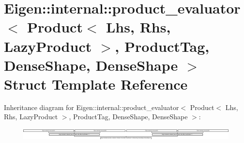 \hypertarget{struct_eigen_1_1internal_1_1product__evaluator_3_01_product_3_01_lhs_00_01_rhs_00_01_lazy_produc1ed1c0c8715953d10d735722e273406b}{}\section{Eigen\+:\+:internal\+:\+:product\+\_\+evaluator$<$ Product$<$ Lhs, Rhs, Lazy\+Product $>$, Product\+Tag, Dense\+Shape, Dense\+Shape $>$ Struct Template Reference}
\label{struct_eigen_1_1internal_1_1product__evaluator_3_01_product_3_01_lhs_00_01_rhs_00_01_lazy_produc1ed1c0c8715953d10d735722e273406b}
Inheritance diagram for Eigen\+:\+:internal\+:\+:product\+\_\+evaluator$<$ Product$<$ Lhs, Rhs, Lazy\+Product $>$, Product\+Tag, Dense\+Shape, Dense\+Shape $>$\+:\begin{figure}[H]
\begin{center}
\leavevmode
\includegraphics[height=0.629685cm]{struct_eigen_1_1internal_1_1product__evaluator_3_01_product_3_01_lhs_00_01_rhs_00_01_lazy_produc1ed1c0c8715953d10d735722e273406b}
\end{center}
\end{figure}
